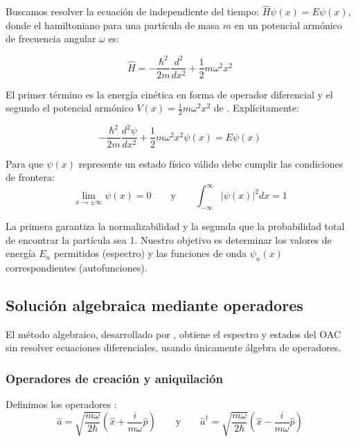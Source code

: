 Buscamos resolver la ecuación de \cite{schrodinger1926a} independiente del tiempo: $\hat{H}\psi(x) = E\psi(x)$, donde el hamiltoniano para una partícula de masa $m$ en un potencial armónico de frecuencia angular $\omega$ es:

\vspace{-20pt}	
\begin{equation}
    \hat{H} = -\frac{\hbar^2}{2m}\frac{d^2}{dx^2} + \frac{1}{2}m\omega^2 x^2
\end{equation}

El primer término es la energía cinética en forma de operador diferencial y el segundo el potencial armónico $V(x) = \frac{1}{2}m\omega^2 x^2$ de \cite{hooke1678}. Explícitamente:

\begin{equation}
-\frac{\hbar^2}{2m}\frac{d^2\psi}{dx^2} + \frac{1}{2}m\omega^2 x^2 \psi(x) = E\psi(x)
\label{eq:schrodinger_oac}
\end{equation}

Para que $\psi(x)$ represente un estado físico válido debe cumplir las condiciones de frontera:
\vspace{-10pt}	
\begin{equation}
\lim_{x \to \pm\infty} \psi(x) = 0 \qquad \text{y} \qquad
\int_{-\infty}^{\infty} |\psi(x)|^2 dx = 1
\end{equation}

La primera garantiza la normalizabilidad y la segunda que la probabilidad total de encontrar la partícula sea 1. Nuestro objetivo es determinar los valores de energía $E_n$ permitidos (espectro) y las funciones de onda $\psi_n(x)$ correspondientes (autofunciones).
	

	
\subsection{Solución algebraica mediante operadores}

El método algebraico, desarrollado por \cite{dirac1930}, obtiene el espectro y estados del OAC sin resolver ecuaciones diferenciales, usando únicamente álgebra de operadores.


\subsubsection{Operadores de creación y aniquilación}

Definimos los operadores \citep{dirac1930}:
\vspace{-5pt}	
\begin{equation}
	\hat{a} = \sqrt{\frac{m\omega}{2\hbar}}\left(\hat{x} + \frac{i}{m\omega}\hat{p}\right) \qquad \text{y} \qquad
	\hat{a}^\dagger = \sqrt{\frac{m\omega}{2\hbar}}\left(\hat{x} - \frac{i}{m\omega}\hat{p}\right)
\end{equation}

